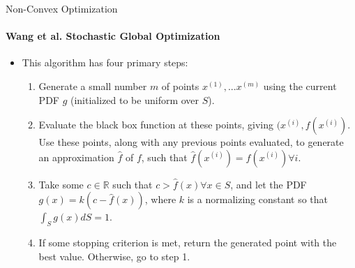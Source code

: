 \documentclass{beamer}
\begin{document}
	\begin{frame}{Non-Convex Optimization}
		\framesubtitle{Wang et al. Stochastic Global Optimization}
		\begin{itemize}
			\item This algorithm has four primary steps:
			\begin{enumerate}
				\item Generate a small number $m$ of points $x^{(1)},...x^{(m)}$ using the current PDF $g$ (initialized to be uniform over $S$).
				\item Evaluate the black box function at these points, giving $(x^{(i)},f(x^{(i)})$. Use these points, along with any previous points evaluated, to generate an approximation $\hat{f}$ of $f$, such that $\hat{f}(x^{(i)}) = f(x^{(i)}) \forall i$.
				\item Take some $c\in\mathbb{R}$ such that $c > \hat{f}(x)\forall x\in S$, and let the PDF $g(x) = k(c-\hat{f}(x))$, where $k$ is a normalizing constant so that $\int_{S}g(x)dS=1$. 
				\item If some stopping criterion is met, return the generated point with the best value. Otherwise, go to step 1.
			\end{enumerate}
		\end{itemize}
	\end{frame}
%
%
\end{document}
